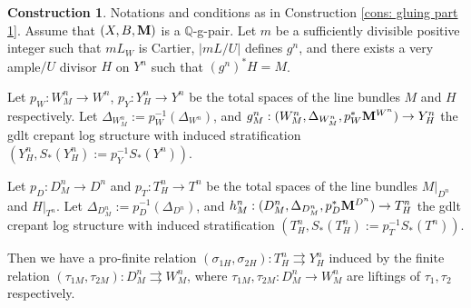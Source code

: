 \documentclass[11pt]{amsart}
\numberwithin{equation}{section}
\newcommand{\Mm}{{\bf{M}}}
\theoremstyle{definition}
\theoremstyle{definition}
\newtheorem{cons}[thm]{Construction}
\theoremstyle{definition}
\begin{document}
\begin{cons}\label{cons: glue part 2}
  Notations and conditions as in Construction \ref{cons: gluing part
  1}. Assume that $(X,B,\Mm)$ is a $\mathbb Q$-g-pair. Let $m$ be a
  sufficiently divisible positive integer such that $mL_W$ is
  Cartier, $|mL/U|$ defines $g^n$, and there exists a very ample$/U$
  divisor $H$ on $Y^n$ such that $(g^{n})^*H=M$.

  Let $p_W: W^n_M\to W^n$, $p_Y: Y^n_H\to Y^n$ be the total spaces of
  the line bundles $M$ and $H$ respectively. Let
  $\Delta_{W^n_M}:=p_W^{-1}(\Delta_{W^n})$, and $g^n_M:
  (W^n_M,\Delta_{W^n_M},p^*_W\Mm^{W^n})\to Y^n_H$ the gdlt crepant
  log structure with induced stratification $(Y^n_H,
  S_*(Y^n_H):=p_Y^{-1}S_*(Y^n))$.

  Let $p_D: D^n_M\to D^n$ and $p_T: T^n_H\to T^n$ be the total spaces
  of the line bundles $M|_{D^n}$ and $H|_{T^n}$. Let
  $\Delta_{D^n_M}:=p_D^{-1}(\Delta_{D^n})$, and $h^n_M:
  (D^n_M,\Delta_{D^n_M},p^*_D\Mm^{D^n})\to T^n_H$ the gdlt crepant
  log structure with induced stratification $(T^n_H,
  S_*(T^n_H):=p_T^{-1}S_*(T^n))$.

  Then we have a pro-finite relation $(\sigma_{1H},\sigma_{2H}):
  T^n_H\rightrightarrows Y^n_H$ induced by the finite relation
  $(\tau_{1M},\tau_{2M}): D^n_M\rightrightarrows W^n_M$, where
  $\tau_{1M},\tau_{2M}: D^n_M\rightarrow W^n_M$ are liftings of
  $\tau_{1},\tau_{2}$ respectively.
\end{cons}
\end{document}
